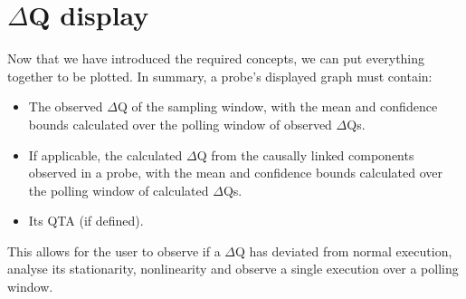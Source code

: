 \section{$\Delta$Q display}
    Now that we have introduced the required concepts, we can put everything together to be plotted. In summary, a probe's displayed graph must contain:
    \begin{itemize}
        \item The observed $\Delta$Q of the sampling window, with the mean and confidence bounds calculated over the polling window of observed $\Delta$Qs.
        \item If applicable, the calculated $\Delta$Q from the causally linked components observed in a probe, with the mean and confidence bounds calculated over the polling window of calculated $\Delta$Qs.
        \item Its QTA (if defined).
    \end{itemize}
    This allows for the user to observe if a $\Delta$Q has deviated from normal execution, analyse its stationarity, nonlinearity and observe a single execution over a polling window.

